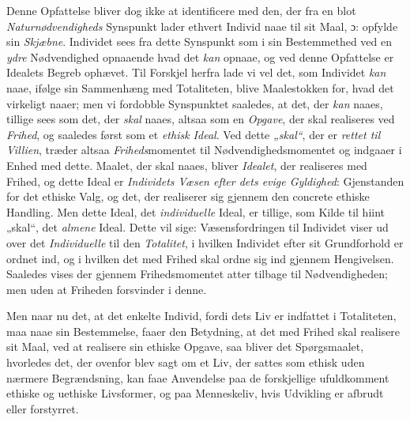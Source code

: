 Denne Opfattelse bliver dog ikke at identificere med den, der fra en blot
\emph{Naturnødvendigheds} Synspunkt lader ethvert Individ naae til sit Maal, ɔ:
opfylde sin \emph{Skjæbne}. Individet sees fra dette Synspunkt som i sin
Bestemmethed ved en \emph{ydre} Nødvendighed opnaaende hvad det \emph{kan}
opnaae, og ved denne Opfattelse er Idealets Begreb ophævet. Til Forskjel herfra
lade vi vel det, som Individet \emph{kan} naae, ifølge sin Sammenhæng med
Totaliteten, blive Maalestokken for, hvad det virkeligt naaer; men vi fordobble
Synspunktet saaledes, at det, der \emph{kan} naaes, tillige sees som det, der
\emph{skal} naaes, altsaa som en \emph{Opgave}, der skal realiseres ved
\emph{Frihed}, og saaledes først som et \emph{ethisk Ideal}. Ved dette
\emph{„skal“}, der er \emph{rettet til Villien}, træder altsaa
\emph{Friheds}momentet til Nødvendighedsmomentet og indgaaer i Enhed med dette.
Maalet, der skal naaes, bliver \emph{Idealet}, der realiseres med Frihed, og dette
Ideal er \emph{Individets Væsen efter dets evige Gyldighed}: Gjenstanden for det
ethiske Valg, og det, der realiserer sig gjennem den concrete ethiske Handling.
Men dette Ideal, det \emph{individuelle} Ideal, er tillige, som Kilde til hiint
„skal“, det \emph{almene} Ideal. Dette vil sige: Væsensfordringen til Individet
viser ud over det \emph{Individuelle} til den \emph{Totalitet}, i hvilken
Individet efter sit Grundforhold er ordnet ind, og i hvilken det med Frihed skal
ordne sig ind gjennem Hengivelsen. Saaledes vises der gjennem Frihedsmomentet
atter tilbage til Nødvendigheden; men uden at Friheden forsvinder i denne.

Men naar nu det, at det enkelte Individ, fordi dets Liv er indfattet i
Totaliteten, maa naae sin Bestemmelse, faaer den Betydning, at det med Frihed skal
realisere sit Maal, ved at realisere sin ethiske Opgave, saa bliver det
Spørgsmaalet, hvorledes det, der ovenfor blev sagt om et
 Liv, der sattes som ethisk uden nærmere Begrændsning, kan faae Anvendelse paa de
forskjellige ufuldkomment ethiske og uethiske Livsformer, og paa Menneskeliv, hvis
Udvikling er afbrudt eller forstyrret.

